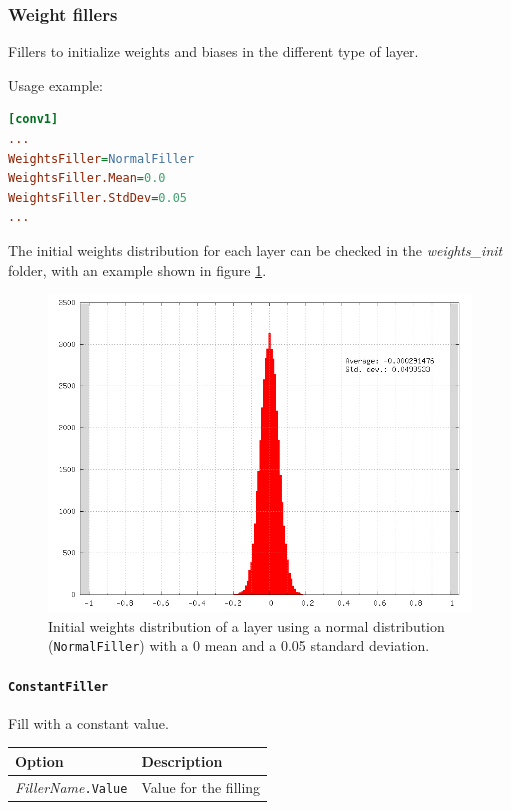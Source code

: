 \documentclass[a4paper,11pt,oneside]{article}
\begin{document}
\subsubsection{Weight fillers}
Fillers to initialize weights and biases in the different type of layer.

Usage example:
\begin{lstlisting}[language=ini]
[conv1]
...
WeightsFiller=NormalFiller
WeightsFiller.Mean=0.0
WeightsFiller.StdDev=0.05
...
\end{lstlisting}

The initial weights distribution for each layer can be checked in the
 \emph{weights\_init} folder, with an example shown in figure
 \ref{fig:weightsInitDistrib}.

\begin{figure}[!htb]
  \centering
  \includegraphics[width=0.8\linewidth]{figs/weightsInitDistrib.png}
  \caption{Initial weights distribution of a layer using a normal distribution
  (\lstinline!NormalFiller!) with a 0 mean and a 0.05 standard deviation.}
  \label{fig:weightsInitDistrib}
\end{figure}


\paragraph{\texorpdfstring{%
\lstinline[basicstyle=\ttfamily\bfseries]!ConstantFiller!}{ConstantFiller}}
Fill with a constant value.

\begin{center}
 \begin{tabular}{| p{5cm} | p{10cm} | }
 \hline
 Option & Description\\
 \hline\hline
  \cellcolor{requiredcolor}\emph{FillerName}\lstinline!.Value! & Value for the
  filling \\
 \hline
\end{tabular}
\end{center}
\end{document}
